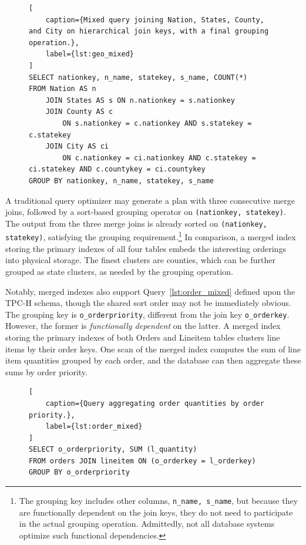 \documentclass[sigconf, pdfa, nonacm]{acmart}
\newenvironment{queryblock}{
    \renewcommand{\lstlistingname}{Query} %
    \lstset{style=query}                   %
    \begin{figure}[htbp]           %
}{
    \end{figure}
}
\begin{document}
\begin{queryblock}
\begin{lstlisting}[
    caption={Mixed query joining Nation, States, County, and City on hierarchical join keys, with a final grouping operation.}, 
    label={lst:geo_mixed}
]
SELECT nationkey, n_name, statekey, s_name, COUNT(*)
FROM Nation AS n 
    JOIN States AS s ON n.nationkey = s.nationkey
    JOIN County AS c
        ON s.nationkey = c.nationkey AND s.statekey = c.statekey
    JOIN City AS ci
        ON c.nationkey = ci.nationkey AND c.statekey = ci.statekey AND c.countykey = ci.countykey
GROUP BY nationkey, n_name, statekey, s_name
\end{lstlisting}
\end{queryblock}


A traditional query optimizer may generate a plan with three consecutive merge joins, followed by a sort-based grouping operator on \texttt{(nationkey, statekey)}.
The output from the three merge joins is already sorted on \texttt{(nationkey, statekey)}, satisfying the grouping requirement.\footnote{The grouping key includes other columns, \texttt{n\_name, s\_name}, but because they are functionally dependent on the join keys, they do not need to participate in the actual grouping operation. Admittedly, not all database systems optimize such functional dependencies.}
In comparison, a merged index storing the primary indexes of all four tables embeds the interesting orderings into physical storage.
The finest clusters are counties, which can be further grouped as state clusters, as needed by the grouping operation.

Notably, merged indexes also support Query~\ref{lst:order_mixed} defined upon the TPC-H schema, though the shared sort order may not be immediately obvious. The grouping key is \texttt{o\_orderpriority}, different from the join key \texttt{o\_orderkey}. However, the former is \textit{functionally dependent} on the latter. A merged index storing the primary indexes of both Orders and Lineitem tables clusters line items by their order keys. One scan of the merged index computes the sum of line item quantities grouped by each order, and the database can then aggregate these sums by order priority.

\begin{queryblock}
\begin{lstlisting}[
    caption={Query aggregating order quantities by order priority.}, 
    label={lst:order_mixed}
]
SELECT o_orderpriority, SUM (l_quantity)
FROM orders JOIN lineitem ON (o_orderkey = l_orderkey)
GROUP BY o_orderpriority
\end{lstlisting}
\end{queryblock}
\end{document}
